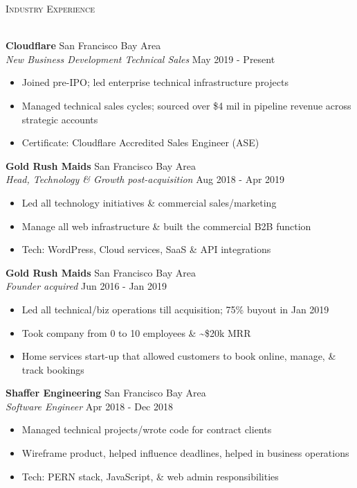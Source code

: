 \documentclass[a4paper]{article}
\newcommand{\lineunder} {
    \vspace*{-8pt} \\
    \hspace*{-18pt} \hrulefill \\
}
\newcommand{\header} [1] {
    {\hspace*{-18pt}\vspace*{6pt} \textsc{#1}}
    \vspace*{-6pt} \lineunder
}
\begin{document}
\header{Industry Experience}
\vspace{1mm}

\textbf{Cloudflare} \hfill San Francisco Bay Area\\
\textit{New Business Development \textbar{} Technical Sales} \hfill May 2019 - Present\\
\vspace{-1mm}
\begin{itemize} \itemsep 1pt
	\item Joined pre-IPO; led enterprise technical infrastructure projects
	\item Managed technical sales cycles; sourced over \$4 mil in pipeline revenue across strategic accounts
	\item Certificate: Cloudflare Accredited Sales Engineer (ASE)
\end{itemize}
\textbf{Gold Rush Maids} \hfill San Francisco Bay Area\\
\textit{Head, Technology \& Growth \textbar{} post-acquisition} \hfill Aug 2018 - Apr 2019\\
\vspace{-1mm}
\begin{itemize} \itemsep 1pt
	\item Led all technology initiatives \& commercial sales/marketing
	\item Manage all web infrastructure \& built the commercial B2B function
	\item Tech: WordPress, Cloud services, SaaS \& API integrations
\end{itemize}
\textbf{Gold Rush Maids} \hfill San Francisco Bay Area\\
\textit{Founder \textbar{} acquired} \hfill Jun 2016 - Jan 2019\\
\vspace{-1mm}
\begin{itemize} \itemsep 1pt
	\item Led all technical/biz operations till acquisition; 75\% buyout in Jan 2019
	\item Took company from 0 to 10 employees \& \textasciitilde{}\$20k MRR
	\item Home services start-up that allowed customers to book online, manage, \& track bookings
\end{itemize}
\textbf{Shaffer Engineering} \hfill San Francisco Bay Area\\
\textit{Software Engineer} \hfill Apr 2018 - Dec 2018\\
\vspace{-1mm}
\begin{itemize} \itemsep 1pt
	\item Managed technical projects/wrote code for contract clients
	\item Wireframe product, helped influence deadlines, helped in business operations
	\item Tech: PERN stack, JavaScript, \& web admin responsibilities
\end{itemize}
\end{document}
